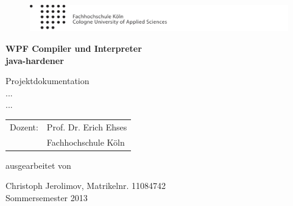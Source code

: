 
\begin{titlepage}

\begin{center}

\begin{figure}[!ht]
	\centering
		\includegraphics[natwidth=920pt, natheight=95pt, width=1.0\textwidth]{tex/logoheader.pdf}
\end{figure}

\vspace{5.0cm}

\begin{Huge}
	\textbf{WPF Compiler und Interpreter}\\
	\vspace{0.1cm}
	\textbf{java-hardener}\\
\end{Huge}

\vspace{0.8cm}

\begin{LARGE}
	Projektdokumentation\\
	\vspace{0.1cm}
	...\\
	\vspace{0.1cm}
	...\\
\end{LARGE}

\vspace{2.5cm}

\begin{tabular}{rl}
        Dozent:  &  Prof. Dr. Erich Ehses\\
       			 &  \small Fachhochschule Köln \\[1.0em]
\end{tabular}

\vspace{2.0cm}

\begin{large}
	ausgearbeitet von\\
	\vspace{0.2cm}
\end{large}

\begin{Large}
	Christoph Jerolimov, Matrikelnr. 11084742\\
	\vspace{0.5cm}
	Sommersemester 2013
\end{Large}

\end{center}

\end{titlepage}
